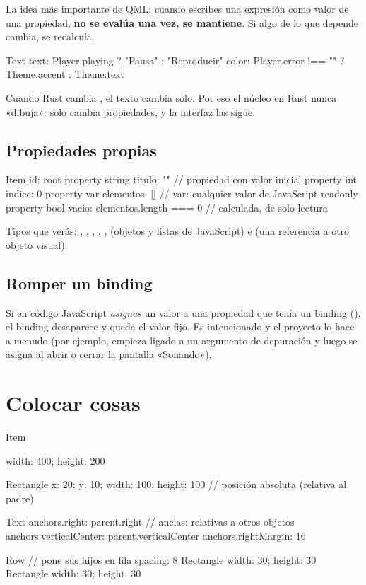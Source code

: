La idea más importante de QML: cuando escribes una expresión como valor de una propiedad,
\textbf{no se evalúa una vez, se mantiene}. Si algo de lo que depende cambia, se recalcula.

\begin{qml}
Text {
    text: Player.playing ? "Pausa" : "Reproducir"
    color: Player.error !== "" ? Theme.accent : Theme.text
}
\end{qml}

Cuando Rust cambia , el texto cambia solo. Por eso el núcleo en Rust nunca
«dibuja»: solo cambia propiedades, y la interfaz las sigue.

\subsection{Propiedades propias}

\begin{qml}
Item {
    id: root
    property string titulo: ""                        // propiedad con valor inicial
    property int indice: 0
    property var elementos: []                        // var: cualquier valor de JavaScript
    readonly property bool vacio: elementos.length === 0   // calculada, de solo lectura
}
\end{qml}

Tipos que verás: , , , , , 
(objetos y listas de JavaScript) e  (una referencia a otro objeto visual).

\subsection{Romper un binding}

Si en código JavaScript \emph{asignas} un valor a una propiedad que tenía un binding
(), el binding desaparece y queda el valor fijo. Es intencionado y el
proyecto lo hace a menudo (por ejemplo,  empieza ligado a un argumento de
depuración y luego se asigna al abrir o cerrar la pantalla «Sonando»).

\section{Colocar cosas}

\begin{qml}
Item {
    width: 400; height: 200

    Rectangle { x: 20; y: 10; width: 100; height: 100 }   // posición absoluta (relativa al padre)

    Text {
        anchors.right: parent.right                        // anclas: relativas a otros objetos
        anchors.verticalCenter: parent.verticalCenter
        anchors.rightMargin: 16
    }

    Row {                                                  // pone sus hijos en fila
        spacing: 8
        Rectangle { width: 30; height: 30 }
        Rectangle { width: 30; height: 30 }
    }
}
\end{qml}

